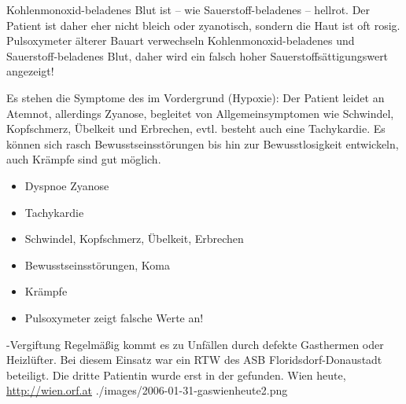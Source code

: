 \TextSlide{\TxSymptome}
{%
Kohlenmonoxid-beladenes Blut ist -- wie
Sauerstoff-beladenes -- hellrot. Der Patient ist daher eher
nicht bleich oder zyanotisch, sondern die Haut ist oft rosig.
Pulsoxymeter älterer Bauart verwechseln
Kohlenmonoxid-beladenes und Sauerstoff-beladenes Blut, daher
wird ein falsch hoher Sauerstoffsättigungswert angezeigt!

Es stehen die Symptome des  im
Vordergrund (Hypoxie): Der Patient leidet an Atemnot,
allerdings  Zyanose, begleitet von
Allgemeinsymptomen wie Schwindel, Kopfschmerz, Übelkeit und
Erbrechen, evtl. besteht auch eine Tachykardie.
Es können sich rasch Bewusstseinsstörungen bis hin zur
Bewusstlosigkeit entwickeln, auch Krämpfe sind gut möglich.
}{
\begin{itemize}
  \item Dyspnoe    Zyanose
  \item Tachykardie
  \item Schwindel, Kopfschmerz, Übelkeit, Erbrechen
  \item Bewusstseinsstörungen, Koma
  \item Krämpfe
  \item Pulsoxymeter zeigt falsche Werte an!
\end{itemize}
}{}{}{}




% 



\Picture
{-Vergiftung}%
{Regel\-mäß\-ig kommt es zu Unfällen durch defekte Gasthermen
oder Heizlüfter. Bei diesem Einsatz war ein RTW des ASB
Floridsdorf-Donaustadt beteiligt. Die dritte Patientin
wurde erst  in der
 gefunden.}%
{}%
{Wien heute, \url{http://wien.orf.at}}%
{}%
{./images/2006-01-31-gaswienheute2.png}%
{}%
{}%


